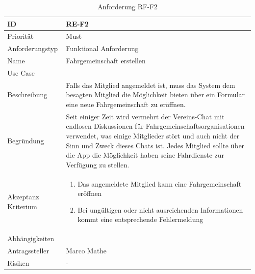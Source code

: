 \begin{table}[ht]
\centering
  \begin{tabular}{ l | p{8cm} }
	\hline
	\rowcolor{gray}
	ID 			&	\textbf{RE-F2}\\ \hline
	Priorität 		&	Must\\ \hline
	Anforderungstyp	&	Funktional Anforderung\\ \hline
	Name 			&	Fahrgemeinschaft erstellen\\ \hline
	Use Case 		&	\nameref{table:use_case_1}\\ \hline
	Beschreibung 	&	Falls das Mitglied angemeldet ist, muss das System dem besagten Mitglied die Möglichkeit bieten über ein Formular eine neue Fahrgemeinschaft zu eröffnen.\\ \hline
	Begründung 		&	Seit einiger Zeit wird vermehrt der Vereins-Chat mit endlosen Diskussionen für Fahrgemeinschaftsorganisationen verwendet, was einige Mitglieder stört und auch nicht der Sinn und Zweck dieses Chats ist. Jedes Mitglied sollte über die App die Möglichkeit haben seine Fahrdienste zur Verfügung zu stellen.\\ \hline
	Akzeptanz Kriterium	&	\begin{enumerate}
					\item Das angemeldete Mitglied kann eine Fahrgemeinschaft eröffnen
					\item Bei ungültigen oder nicht ausreichenden Informationen kommt eine entsprechende Fehlermeldung
					\end{enumerate}
					\\ \hline
	Abhängigkeiten 	&	\nameref{table:req_1}\\ \hline
	Antragssteller 	&	Marco Mathe\\ \hline
	Risiken	 	&	-
  \end{tabular}
   \caption{Anforderung RF-F2}\label{table:req_2}
\end{table}


